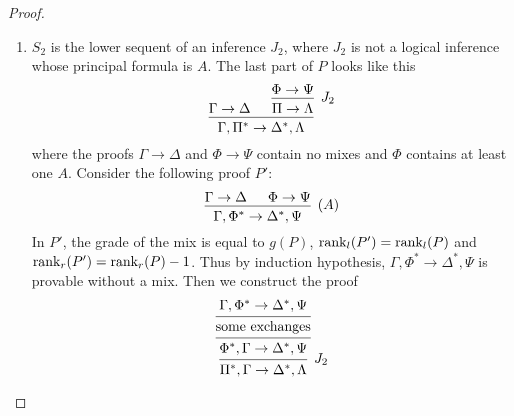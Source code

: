 \documentclass[11pt]{article}
\begin{document}
\begin{proof}
\begin{enumerate}
\begin{enumerate}
\begin{enumerate}
\item \(S_2\) is the lower sequent of an inference \(J_2\), where \(J_2\)
is not a logical inference whose principal formula is \(A\). The
last part of \(P\) looks like this
\begin{equation*}
\begin{prooftree}%
\hypo{\Gamma\to\Delta}
\hypo{\Phi\to\Psi}
\infer1[\(J_2\)]{\Pi\to\Lambda}
\infer2{\Gamma,\Pi^*\to\Delta^*,\Lambda}
\end{prooftree}
\end{equation*}
where the proofs \(\Gamma\to\Delta\) and \(\Phi\to\Psi\) contain no
mixes and \(\Phi\) contains at least one \(A\). Consider the following
proof \(P'\):
\begin{equation*}
\begin{prooftree}%
\hypo{\Gamma\to\Delta}
\hypo{\Phi\to\Psi}
\infer2[(\(A\))]{\Gamma,\Phi^*\to\Delta^*,\Psi}
\end{prooftree}
\end{equation*}
In \(P'\), the grade of the mix is equal to \(g(P)\),
\(\text{rank}_l(P')=\text{rank}_l(P)\) and \(\text{rank}_r(P')=\text{rank}_r(P)-1\). Thus by
induction hypothesis, \(\Gamma,\Phi^*\to\Delta^*,\Psi\) is provable without
a mix. Then we construct the proof
\begin{equation*}
\begin{prooftree}%
\hypo{\Gamma,\Phi^*\to\Delta^*,\Psi}
\infer1{\text{some exchanges}}
\infer1{\Phi^*,\Gamma\to\Delta^*,\Psi}
\infer1[\(J_2\)]{\Pi^*,\Gamma\to\Delta^*,\Lambda}
\end{prooftree}
\end{equation*}


\end{enumerate}
\end{enumerate}
\end{enumerate}
\end{proof}
\end{document}

